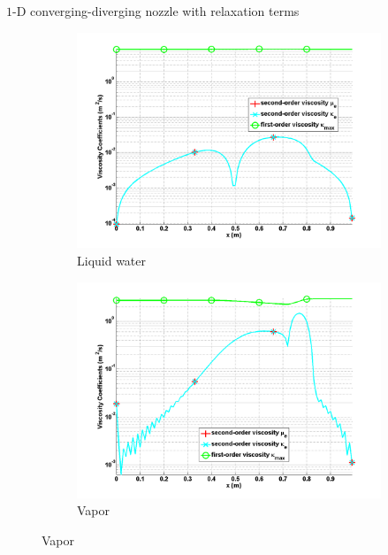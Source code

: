 \documentclass[xcolor=dvipsnames,10pt]{beamer}
\begin{document}
\begin{frame}{$1$-D converging-diverging nozzle with relaxation terms}
\begin{figure}[H]
\begin{subfigure}[b]{0.38\textwidth}
\centering
\includegraphics[width=\textwidth]{../figures/SEM/Aint1e4_liquid_viscosity_kappa_mu.png}
\caption{Liquid water}
\end{subfigure}
%
\begin{subfigure}[b]{0.38\textwidth}
\centering
\includegraphics[width=\textwidth]{../figures/SEM/Aint1e4_vapor_viscosity_kappa_mu.png}
\caption{Vapor}
\end{subfigure}


\end{figure}
\end{frame}
\end{document}
